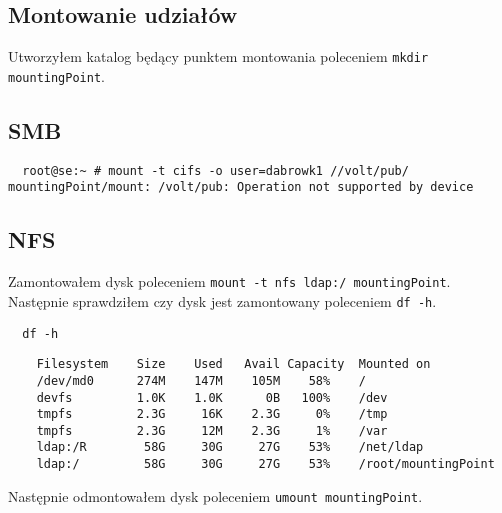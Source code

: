 \documentclass{article} %
\begin{document}
\subsection{Montowanie udziałów}
Utworzyłem katalog będący punktem montowania poleceniem \texttt{mkdir mountingPoint}.

\subsection{SMB}
\begin{verbatim}
  root@se:~ # mount -t cifs -o user=dabrowk1 //volt/pub/ mountingPoint/mount: /volt/pub: Operation not supported by device 
\end{verbatim}

\subsection{NFS}
Zamontowałem dysk poleceniem \texttt{mount -t nfs ldap:/ mountingPoint}. Następnie sprawdziłem czy dysk jest zamontowany poleceniem \texttt{df -h}.

\begin{tcolorbox}[colback=yellow!10!white,colframe=red!45!black,coltitle=yellow!100!black, title=FreeBSD]
  \begin{lstlisting}
  df -h
  \end{lstlisting}
  \tcblower
  \tiny
  \begin{lstlisting}
    Filesystem    Size    Used   Avail Capacity  Mounted on
    /dev/md0      274M    147M    105M    58%    /
    devfs         1.0K    1.0K      0B   100%    /dev
    tmpfs         2.3G     16K    2.3G     0%    /tmp
    tmpfs         2.3G     12M    2.3G     1%    /var
    ldap:/R        58G     30G     27G    53%    /net/ldap
    ldap:/         58G     30G     27G    53%    /root/mountingPoint 
  \end{lstlisting}
\end{tcolorbox}
\normalsize

Następnie odmontowałem dysk poleceniem \texttt{umount mountingPoint}.
\end{document}

